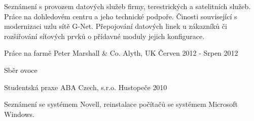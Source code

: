 \begin{cventries}
{\begin{cvitems}
      \item {Seznámení s provozem datových služeb firmy, terestrických a satelitních služeb. Práce na dohledovém centru a jeho technické podpoře.
      Činosti související s modernizaci uzlu sítě G-Net. Přepojování datových linek u zákazníků či rozšiřování síťových prvků o přídavné moduly jejich konfigurace.}
    \end{cvitems}
   }
   \cventry
   {Práce na farmě}
   {Peter Marshall \& Co.}
   {Alyth, UK}
   {Červen 2012 - Srpen 2012}
   {
    \begin{cvitems}
      \item {Sběr ovoce}
    \end{cvitems}
   }
   \cventry
   {Studentská praxe}
   {ABA Czech, s.r.o.}
   {Hustopeče}
   {2010}
   {
    \begin{cvitems}
      \item {Seznámení se systémem Novell, reinstalace počítačů se systémem Microsoft Windows.}
    \end{cvitems}
   }

\end{cventries}
